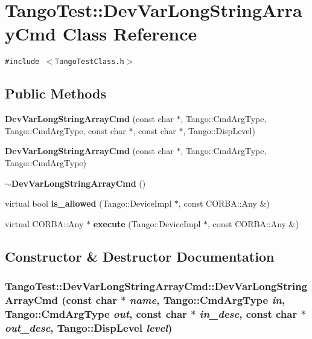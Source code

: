 \section{Tango\-Test::Dev\-Var\-Long\-String\-Array\-Cmd  Class Reference}
\label{classTangoTest_1_1DevVarLongStringArrayCmd}
{\tt \#include $<$Tango\-Test\-Class.h$>$}

\subsection*{Public Methods}
\begin{CompactItemize}
\item 
{\bf Dev\-Var\-Long\-String\-Array\-Cmd} (const char $\ast$, Tango::Cmd\-Arg\-Type, Tango::Cmd\-Arg\-Type, const char $\ast$, const char $\ast$, Tango::Disp\-Level)
\item 
{\bf Dev\-Var\-Long\-String\-Array\-Cmd} (const char $\ast$, Tango::Cmd\-Arg\-Type, Tango::Cmd\-Arg\-Type)
\item 
{\bf $\sim$Dev\-Var\-Long\-String\-Array\-Cmd} ()
\item 
virtual bool {\bf is\_\-allowed} (Tango::Device\-Impl $\ast$, const CORBA::Any \&)
\item 
virtual CORBA::Any $\ast$ {\bf execute} (Tango::Device\-Impl $\ast$, const CORBA::Any \&)
\end{CompactItemize}


\subsection{Constructor \& Destructor Documentation}
\subsubsection{\setlength{\rightskip}{0pt plus 5cm}Tango\-Test::Dev\-Var\-Long\-String\-Array\-Cmd::Dev\-Var\-Long\-String\-Array\-Cmd (const char $\ast$ {\em name}, Tango::Cmd\-Arg\-Type {\em in}, Tango::Cmd\-Arg\-Type {\em out}, const char $\ast$ {\em in\_\-desc}, const char $\ast$ {\em out\_\-desc}, Tango::Disp\-Level {\em level})}\label{classTangoTest_1_1DevVarLongStringArrayCmd_a0}


